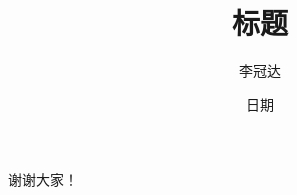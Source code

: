\documentclass[notheorems,compress,table]{beamer}
\title[标题]{标题}
\author[李冠达]{李冠达}
\institute[AMSS, CAS]{}
\date[日期]{\normalsize 日期}
\begin{document}
	
	\frame{\titlepage}


\section{}
\begin{frame}
	\begin{center}
		\large
		谢谢大家！
	\end{center}
\end{frame}
\end{document}
